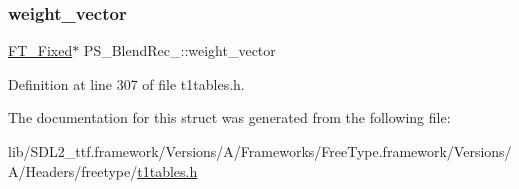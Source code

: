 \subsubsection{\texorpdfstring{weight\_vector}{weight\_vector}}
{\footnotesize\ttfamily \mbox{\hyperlink{fttypes_8h_a5f5a679cc09f758efdd0d1c5feed3c3d}{F\+T\+\_\+\+Fixed}}$\ast$ P\+S\+\_\+\+Blend\+Rec\+\_\+\+::weight\+\_\+vector}



Definition at line 307 of file t1tables.\+h.



The documentation for this struct was generated from the following file\+:\begin{DoxyCompactItemize}
\item 
lib/\+S\+D\+L2\+\_\+ttf.\+framework/\+Versions/\+A/\+Frameworks/\+Free\+Type.\+framework/\+Versions/\+A/\+Headers/freetype/\mbox{\hyperlink{t1tables_8h}{t1tables.\+h}}\end{DoxyCompactItemize}
